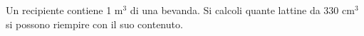 Un recipiente contiene 1 m$^3$ di una bevanda. 
Si calcoli quante lattine da 330 cm$^3$ si possono riempire 
con il suo contenuto.